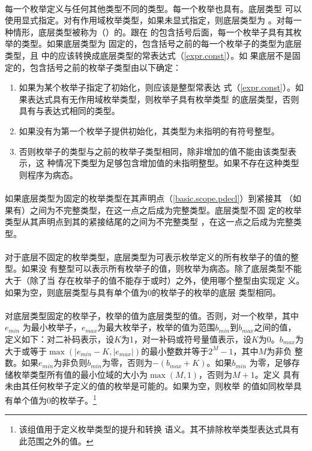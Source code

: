 \paragraph{}
每一个枚举定义与任何其他类型不同的类型。每一个枚举也具有。底层类型
可以使用显式指定。对有作用域枚举类型，如果未显式指定，则底层类型为
。对每一种情形，底层类型被称为（）的。跟在
的包含括号后面，每一个枚举子具有其枚举的类型。如果底层类型为
固定的，包含括号之前的每一个枚举子的类型为底层类型，且
中的应该转换成底层类型的常表达式（\ref{expr.const}）。如
果底层不是固定的，包含括号之前的枚举子类型由以下确定：
\begin{enumerate}
  \item{如果为某个枚举子指定了初始化，则应该是整型常表达
    式（\ref{expr.const}）。如果表达式具有无作用域枚举类型，则枚举子具有枚举类型
    的底层类型，否则具有与表达式相同的类型。}
  \item{如果没有为第一个枚举子提供初始化，其类型为未指明的有符号整型。}
  \item{否则枚举子的类型与之前的枚举子类型相同，除非增加的值不能由该类型表示，这
    种情况下类型为足够包含增加值的未指明整型。如果不存在这种类型则程序为病态。}
\end{enumerate}

\paragraph{}
如果底层类型为固定的枚举类型在其声明点（\ref{basic.scope.pdecl}）到紧接其
（如果有）之间为不完整类型，在这一点之后成为完整类型。底层类型不固
定的枚举类型从其声明点到其的紧接结尾的\tm{\}}之间为不完整类型
，在这一点之后成为完整类型。

\paragraph{}
对于底层不固定的枚举类型，底层类型为可表示枚举定义的所有枚举子的值的整型。如果没
有整型可以表示所有枚举子的值，则枚举为病态。除了底层类型不能大于（除了当
存在枚举子的值不能存于或时）之外，使用哪个整型由实现定
义。如果为空，则底层类型与具有单个值为0的枚举子的枚举的底层
类型相同。

\paragraph{}
对底层类型固定的枚举子，枚举的值为底层类型的值。否则，对一个枚举，其中$e_{min}$
为最小枚举子，$e_{max}$为最大枚举子，枚举的值为范围$b_{min}$到$b_{max}$之间的值，
定义如下：对二补码表示，设$K$为1，对一补码或符号量值表示，设$K$为0。$b_{max}$为
大于或等于$\max(|e_{min} - K, |e_{max}|)$的最小整数并等于$2^M-1$，其中$M$为非负
整数。如果$e_{min}$为非负则$b_{min}$为零，否则为$-(b_{max} + K)$。如果$b_{min}$
为零，足够存储枚举类型所有值的最小位域的大小为$\max(M, 1)$，否则为$M + 1$。定义
具有未由其任何枚举子定义的值的枚举是可能的。如果为空，则枚举
的值如同枚举具有单个值为0的枚举子。\footnote{该组值用于定义枚举类型的提升和转换
语义。其不排除枚举类型表达式具有此范围之外的值。}

